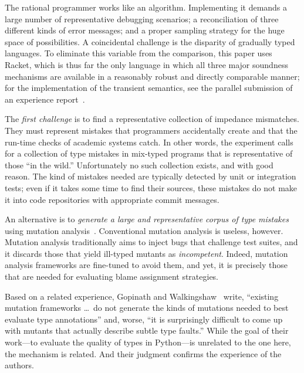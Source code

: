 
The rational programmer works like an algorithm. Implementing it demands a large
number of representative debugging scenarios; a reconciliation of three
different kinds of error messages; and a proper sampling strategy for the huge
space of possibilities. A coincidental challenge is the disparity of gradually
typed languages. To eliminate this variable from the comparison, this paper uses
Racket, which is thus far the only language in which all three major soundness
mechanisms are available in a reasonably robust and directly comparable manner;
for the implementation of the transient semantics, see the parallel submission
of an experience report~\cite{ttt21}.

The {\em first challenge\/} is to find a representative collection of impedance
mismatches. They must represent mistakes that programmers accidentally create
and that the run-time checks of academic systems catch. In other words, the
experiment calls for a collection of type mistakes in mix-typed programs that is
representative of those ``in the wild.''  Unfortunately no such collection
exists, and with good reason. The kind of mistakes needed are typically detected
by unit or integration tests; even if it takes some time to find their sources,
these mistakes do not make it into code repositories with appropriate commit
messages.

An alternative is to {\em generate a large and representative corpus of type
mistakes \/} using mutation analysis~\cite{lipton1971fault, demillo1978hints,
jia2011analysis}. Conventional mutation analysis is useless, however.  Mutation
analysis traditionally aims to inject bugs that challenge test suites, and it
discards those that yield ill-typed mutants as \emph{incompetent}. Indeed,
mutation analysis frameworks are fine-tuned to avoid them, and yet, it is
precisely those that are needed for evaluating blame assignment strategies.

Based on a related experience, Gopinath and Walkingshaw~\cite{gw-mutation} write,
``existing mutation frameworks \ldots\ do not generate the kinds of mutations
needed to best evaluate type annotations'' and, worse, ``it is surprisingly
difficult to come up with mutants that actually describe subtle type faults.''
While the goal of their work---to evaluate the quality of types in
Python---is unrelated to the one here, the mechanism is related. And their
judgment confirms the experience of the authors. 

